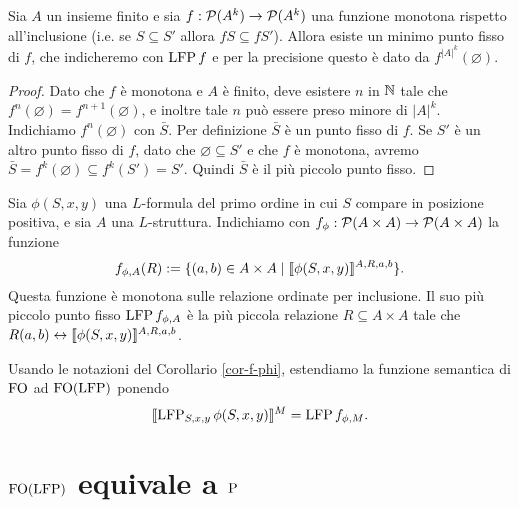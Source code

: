 \begin{teorema}
\label{teo-tarski-knaster}
 Sia $A$ un insieme finito e sia $f: \powerset(A^k) \to \powerset(A^k)$ una
 funzione monotona rispetto all'inclusione
 (i.e. se $S \subseteq S'$ allora $f S \subseteq f S'$). Allora esiste un minimo
 punto fisso di $f$, che indicheremo con $\LFP f$ e per la precisione
 questo è dato da $f^{|A|^k}(\varnothing)$.
\end{teorema}

\begin{proof}
 Dato che $f$ è monotona e $A$ è finito, deve esistere $n$ in $\N$ tale che
 $f^n(\varnothing) = f^{n+1}(\varnothing)$, e inoltre tale $n$ può essere preso
 minore di $|A|^k$. Indichiamo $f^n(\varnothing)$ con $\bar{S}$.
 Per definizione $\bar{S}$ è un punto fisso di $f$.
 Se $S'$ è un altro punto fisso di $f$, dato che $\varnothing \subseteq S'$ e
 che $f$ è monotona, avremo $\bar{S} = f^k(\varnothing) \subseteq f^k(S') = S'$.
 Quindi $\bar{S}$ è il più piccolo punto fisso.
\end{proof}



\begin{corollario}
\label{cor-f-phi}
 Sia $\phi(S,x,y)$ una $L$-formula del primo ordine in cui $S$ compare in posizione
 positiva, e sia $A$ una $L$-struttura.
 Indichiamo con $f_\phi: \powerset (A \times A) \to \powerset (A\times A)$ la funzione
 \[ f_{\phi,A}(R) := \{ (a,b) \in A \times A \mid \semantic{ \phi (S,x,y)}^{A,R,a,b} \}. \]
 Questa funzione è monotona sulle relazione ordinate per inclusione.
 Il suo più piccolo punto fisso $\LFP f_{\phi,A}$ è la più piccola relazione
 $R \subseteq A \times A$ tale che $R(a,b) \leftrightarrow \semantic{\phi(S,x,y)}^{A,R,a,b}$.
\end{corollario}

\begin{definizione}
 Usando le notazioni del Corollario \ref{cor-f-phi}, estendiamo la funzione
 semantica di $\FO$ ad $\FO(\LFP)$ ponendo
 \[\semantic{\LFP_{S,x,y} \phi(S,x,y)}^M = \LFP f_{\phi,M}.\]
\end{definizione}

\section{\texorpdfstring{$\FO(\LFP)$}{FO(LFP)} equivale a \texorpdfstring{$\P$}{P}}

